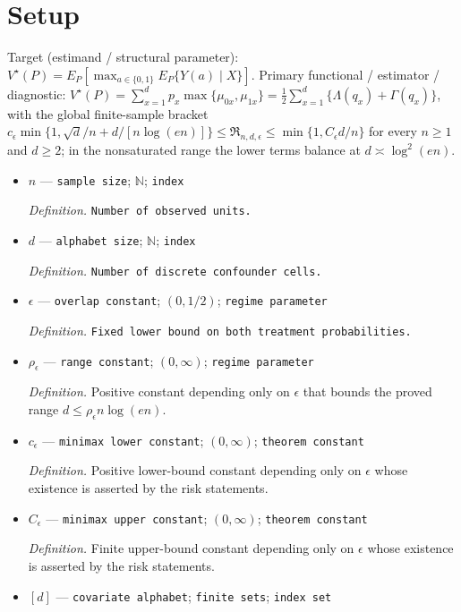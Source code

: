 \documentclass{article}
\begin{document}
\section{Setup}

Target (estimand / structural parameter): \(V^\star(P)=E_P[\max_{a\in\{0,1\}}E_P\{Y(a)\mid X\}]\).
Primary functional / estimator / diagnostic: \(V^\star(P)=\sum_{x=1}^dp_x\max\{\mu_{0x},\mu_{1x}\}=\frac12\sum_{x=1}^d\{\Lambda(q_x)+\Gamma(q_x)\}\), with the global finite-sample bracket \(c_\epsilon\min\{1,\sqrt d/n+d/[n\log(en)]\}\leq\mathfrak R_{n,d,\epsilon}\leq\min\{1,C_\epsilon d/n\}\) for every \(n\geq1\) and \(d\geq2\); in the nonsaturated range the lower terms balance at \(d\asymp\log^2(en)\).
\begin{itemize}
  \item \(n\) --- \texttt{sample size}; \(\mathbb N\); \texttt{index}
  \par\smallskip\noindent\emph{Definition.} \texttt{Number of observed units.}
  \item \(d\) --- \texttt{alphabet size}; \(\mathbb N\); \texttt{index}
  \par\smallskip\noindent\emph{Definition.} \texttt{Number of discrete confounder cells.}
  \item \(\epsilon\) --- \texttt{overlap constant}; \((0,1/2)\); \texttt{regime parameter}
  \par\smallskip\noindent\emph{Definition.} \texttt{Fixed lower bound on both treatment probabilities.}
  \item \(\rho_\epsilon\) --- \texttt{range constant}; \((0,\infty)\); \texttt{regime parameter}
  \par\smallskip\noindent\emph{Definition.} Positive constant depending only on \(\epsilon\) that bounds the proved range \(d\le \rho_\epsilon n\log(en)\).
  \item \(c_\epsilon\) --- \texttt{minimax lower constant}; \((0,\infty)\); \texttt{theorem constant}
  \par\smallskip\noindent\emph{Definition.} Positive lower-bound constant depending only on \(\epsilon\) whose existence is asserted by the risk statements.
  \item \(C_\epsilon\) --- \texttt{minimax upper constant}; \((0,\infty)\); \texttt{theorem constant}
  \par\smallskip\noindent\emph{Definition.} Finite upper-bound constant depending only on \(\epsilon\) whose existence is asserted by the risk statements.
  \item \([d]\) --- \texttt{covariate alphabet}; \texttt{finite sets}; \texttt{index set}

\end{itemize}
\end{document}
